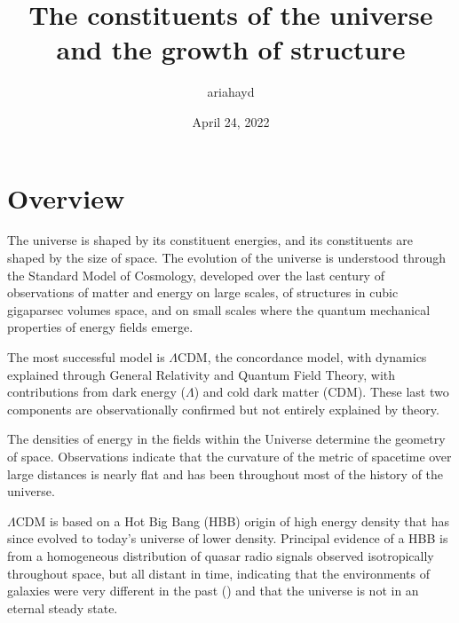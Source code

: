 \documentclass{paper}
\begin{document}
 

\title{The constituents of the universe and the growth of structure}
\author{ariahayd}
\date{April 24, 2022}
\maketitle

\section*{Overview}
  The universe is shaped by its constituent energies, and its constituents are
  shaped by the size of space. The evolution of the universe is understood 
  through the Standard Model of Cosmology, developed over the last 
  century of observations of matter and energy on large scales, of structures 
  in cubic gigaparsec volumes space, and on small scales 
  where the quantum mechanical properties of energy fields emerge. 

  The most successful model is $\Lambda$CDM, the concordance model, with 
  dynamics explained through General Relativity and Quantum Field Theory, 
  with contributions from dark energy ($\Lambda$) and cold dark matter 
  (CDM). These last two components are observationally confirmed but not 
  entirely explained by theory. 

  The densities of energy in the fields within the Universe determine the 
  geometry of space.  Observations indicate that the curvature of the metric 
  of spacetime over large distances is nearly flat and has been throughout 
  most of the history of the universe.
  
  $\Lambda$CDM is based on a Hot Big Bang (HBB) origin of high energy density 
  that has since evolved to today's universe of lower density. 
  Principal evidence of a HBB is from a homogeneous distribution of 
  quasar radio signals observed isotropically throughout space, but all 
  distant in time, indicating that the environments of galaxies were very 
  different in the past (\cite{Secrest_2021}) and that the universe is not in 
  an eternal steady state. 

\end{document}
